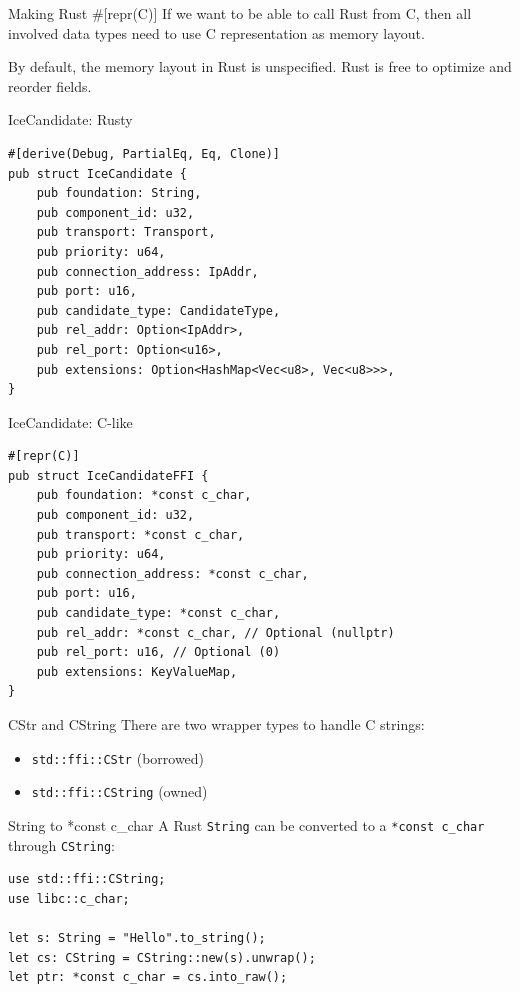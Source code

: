 \documentclass[aspectratio=1610,14pt,t]{beamer}
\begin{document}
\begin{frame}[c]{Making Rust \#[repr(C)]}
  If we want to be able to call Rust from C, then all involved data types need
  to use C representation as memory layout.

  By default, the memory layout in Rust is unspecified. Rust is free to optimize
  and reorder fields.
\end{frame}

\begin{frame}[c,fragile]{IceCandidate: Rusty}
  \begin{verbatim}
#[derive(Debug, PartialEq, Eq, Clone)]
pub struct IceCandidate {
    pub foundation: String,
    pub component_id: u32,
    pub transport: Transport,
    pub priority: u64,
    pub connection_address: IpAddr,
    pub port: u16,
    pub candidate_type: CandidateType,
    pub rel_addr: Option<IpAddr>,
    pub rel_port: Option<u16>,
    pub extensions: Option<HashMap<Vec<u8>, Vec<u8>>>,
}
  \end{verbatim}
\end{frame}

\begin{frame}[c,fragile]{IceCandidate: C-like}
  \begin{verbatim}
#[repr(C)]
pub struct IceCandidateFFI {
    pub foundation: *const c_char,
    pub component_id: u32,
    pub transport: *const c_char,
    pub priority: u64,
    pub connection_address: *const c_char,
    pub port: u16,
    pub candidate_type: *const c_char,
    pub rel_addr: *const c_char, // Optional (nullptr)
    pub rel_port: u16, // Optional (0)
    pub extensions: KeyValueMap,
}
  \end{verbatim}
\end{frame}

\begin{frame}[c]{CStr and CString}
  There are two wrapper types to handle C strings:

  \begin{itemize}
    \item \texttt{std::ffi::CStr} (borrowed)
    \item \texttt{std::ffi::CString} (owned)
  \end{itemize}
\end{frame}

\begin{frame}[c,fragile]{String to *const c\_char}
  A Rust \texttt{String} can be converted to a \texttt{*const c\_char} through
  \texttt{CString}:

  \begin{verbatim}
use std::ffi::CString;
use libc::c_char;

let s: String = "Hello".to_string();
let cs: CString = CString::new(s).unwrap();
let ptr: *const c_char = cs.into_raw();
  \end{verbatim}
\end{frame}
\end{document}
